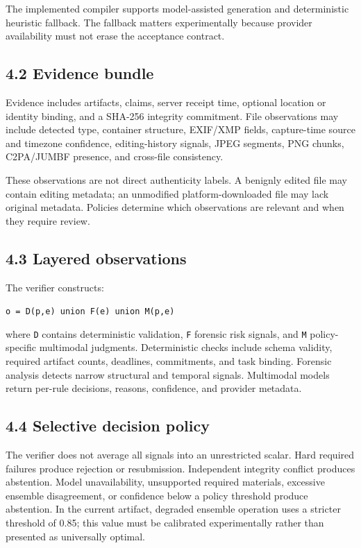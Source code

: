 \documentclass[11pt]{article}
\begin{document}
The implemented compiler supports model-assisted generation and deterministic heuristic fallback. The fallback matters experimentally because provider availability must not erase the acceptance contract.\par

\subsection{4.2 Evidence bundle}

Evidence includes artifacts, claims, server receipt time, optional location or identity binding, and a SHA-256 integrity commitment. File observations may include detected type, container structure, EXIF/XMP fields, capture-time source and timezone confidence, editing-history signals, JPEG segments, PNG chunks, C2PA/JUMBF presence, and cross-file consistency.\par

These observations are not direct authenticity labels. A benignly edited file may contain editing metadata; an unmodified platform-downloaded file may lack original metadata. Policies determine which observations are relevant and when they require review.\par

\subsection{4.3 Layered observations}

The verifier constructs:\par

\texttt{o = D(p,e)  union  F(e)  union  M(p,e)}\par

where \texttt{D} contains deterministic validation, \texttt{F} forensic risk signals, and \texttt{M} policy-specific multimodal judgments. Deterministic checks include schema validity, required artifact counts, deadlines, commitments, and task binding. Forensic analysis detects narrow structural and temporal signals. Multimodal models return per-rule decisions, reasons, confidence, and provider metadata.\par

\subsection{4.4 Selective decision policy}

The verifier does not average all signals into an unrestricted scalar. Hard required failures produce rejection or resubmission. Independent integrity conflict produces abstention. Model unavailability, unsupported required materials, excessive ensemble disagreement, or confidence below a policy threshold produce abstention. In the current artifact, degraded ensemble operation uses a stricter threshold of 0.85; this value must be calibrated experimentally rather than presented as universally optimal.\par
\end{document}
